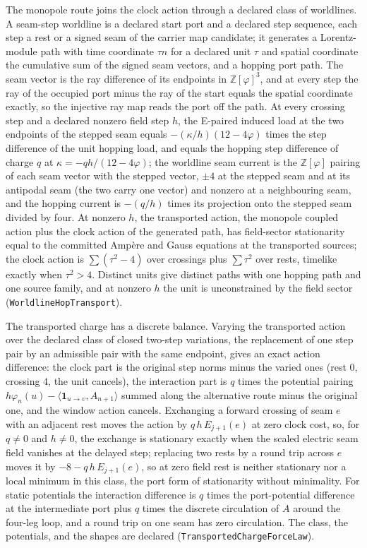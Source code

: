 \documentclass[11pt]{article}
\begin{document}
The monopole route joins the clock action through a declared class of
worldlines. A seam-step worldline is a declared start port and a declared
step sequence, each step a rest or a signed seam of the carrier map
candidate; it generates a Lorentz-module path with time coordinate
\(\tau n\) for a declared unit \(\tau\) and spatial coordinate the
cumulative sum of the signed seam vectors, and a hopping port path. The
seam vector is the ray difference of its endpoints in
\(\mathbb Z[\varphi]^3\), and at every step the ray of the occupied port
minus the ray of the start equals the spatial coordinate exactly, so the
injective ray map reads the port off the path. At every crossing step and a
declared nonzero field step \(h\), the
E-paired induced load at the two endpoints of the stepped seam equals
\(-(\kappa/h)(12-4\varphi)\) times the step difference of the unit hopping
load, and equals the hopping step difference of charge \(q\) at
\(\kappa=-qh/(12-4\varphi)\); the worldline seam current is the
\(\mathbb Z[\varphi]\) pairing of each seam vector with the stepped vector,
\(\pm4\) at the stepped seam and at its antipodal seam (the two carry one
vector) and nonzero at a neighbouring seam, and the hopping current is
\(-(q/h)\) times its projection onto the stepped seam
divided by four. At nonzero \(h\), the transported action, the monopole coupled action plus
the clock action of the generated path, has field-sector stationarity
equal to the committed Amp\`ere and Gauss equations at the transported
sources; the clock action is \(\sum(\tau^2-4)\) over crossings plus
\(\sum\tau^2\) over rests, timelike exactly when \(\tau^2>4\). Distinct
units give distinct paths with one hopping path and one source family, and
at nonzero \(h\) the unit is unconstrained by the field sector
(\texttt{WorldlineHopTransport}).

The transported charge has a discrete balance. Varying the transported
action over the declared class of closed two-step variations, the
replacement of one step pair by an admissible pair with the same endpoint,
gives an exact action difference: the clock part is the original step norms
minus the varied ones (rest \(0\), crossing \(4\), the unit cancels), the
interaction part is \(q\) times the potential pairing
\(h\varphi_n(u)-\langle\mathbf 1_{u\to v},A_{n+1}\rangle\) summed along the
alternative route minus the original one, and the window action cancels.
Exchanging a forward crossing of seam \(e\) with an adjacent rest moves the
action by \(q\,h\,E_{j+1}(e)\) at zero clock cost, so, for \(q\ne0\) and
\(h\ne0\), the exchange is stationary exactly when the scaled electric seam
field vanishes at the delayed step; replacing two rests by a round trip across
\(e\) moves it by
\(-8-q\,h\,E_{j+1}(e)\), so at zero field rest is neither stationary nor a
local minimum in this class, the port form of stationarity without
minimality. For static potentials the interaction difference is \(q\) times
the port-potential difference at the intermediate port plus \(q\) times the
discrete circulation of \(A\) around the four-leg loop, and a round trip on
one seam has zero circulation. The class, the potentials, and the shapes are
declared (\texttt{TransportedChargeForceLaw}).
\end{document}
